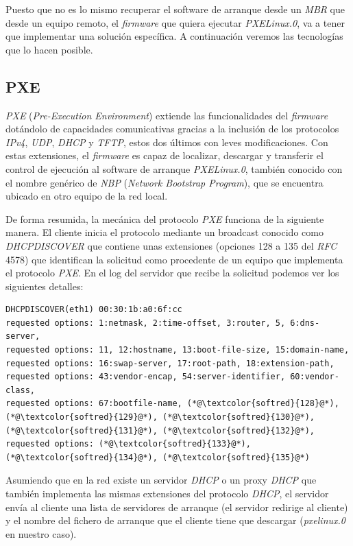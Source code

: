 \documentclass[a4paper,12pt,spanish,final]{epsc_tfc_pfc}
\begin{document}
Puesto que no es lo mismo recuperar el software de arranque desde un \emph{MBR} que desde un equipo remoto, el \emph{firmware} que quiera ejecutar \emph{PXELinux.0}, va a tener que implementar una solución específica. A continuación veremos las tecnologías que lo hacen posible.

\subsection{PXE}
\emph{PXE} (\emph{Pre-Execution Environment}) extiende las funcionalidades del \emph{firmware} dotándolo de capacidades comunicativas gracias a la inclusión de los protocolos \emph{IPv4}, \emph{UDP}, \emph{DHCP} y \emph{TFTP}, estos dos últimos con leves modificaciones. Con estas extensiones, el \emph{firmware} es capaz de localizar, descargar y transferir el control de ejecución al software de arranque \emph{PXELinux.0}, también conocido con el nombre genérico de \emph{NBP} (\emph{Network Bootstrap Program}), que se encuentra ubicado en otro equipo de la red local.

De forma resumida, la mecánica del protocolo \emph{PXE} funciona de la siguiente manera. El cliente inicia el protocolo mediante un broadcast conocido como \emph{DHCPDISCOVER} que contiene unas extensiones (opciones 128 a 135 del \emph{RFC} 4578) que identifican la solicitud como procedente de un equipo que implementa el protocolo \emph{PXE}. En el log del servidor que recibe la solicitud podemos ver los siguientes detalles:\\

\begin{lstlisting}[style=dnsmasq]
DHCPDISCOVER(eth1) 00:30:1b:a0:6f:cc
requested options: 1:netmask, 2:time-offset, 3:router, 5, 6:dns-server,
requested options: 11, 12:hostname, 13:boot-file-size, 15:domain-name,
requested options: 16:swap-server, 17:root-path, 18:extension-path,
requested options: 43:vendor-encap, 54:server-identifier, 60:vendor-class,
requested options: 67:bootfile-name, (*@\textcolor{softred}{128}@*), (*@\textcolor{softred}{129}@*), (*@\textcolor{softred}{130}@*), (*@\textcolor{softred}{131}@*), (*@\textcolor{softred}{132}@*),
requested options: (*@\textcolor{softred}{133}@*), (*@\textcolor{softred}{134}@*), (*@\textcolor{softred}{135}@*)
\end{lstlisting}

Asumiendo que en la red existe un servidor \emph{DHCP} o un proxy \emph{DHCP} que también implementa las mismas extensiones del protocolo \emph{DHCP}, el servidor envía al cliente una lista de servidores de arranque (el servidor redirige al cliente) y el nombre del fichero de arranque que el cliente tiene que descargar (\emph{pxelinux.0} en nuestro caso).\\
\end{document}
